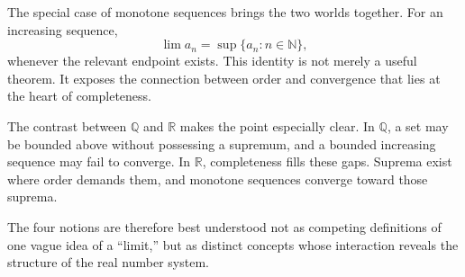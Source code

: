 \documentclass{essay}
\begin{document}
The special case of monotone sequences brings the two worlds together. For an increasing sequence,
\[
    \lim a_n=\sup\{a_n:n\in\mathbb{N}\},
\]
whenever the relevant endpoint exists. This identity is not merely a useful theorem. It exposes the connection between order and convergence that lies at the heart of completeness.

The contrast between $\mathbb{Q}$ and $\mathbb{R}$ makes the point especially clear. In $\mathbb{Q}$, a set may be bounded above without possessing a supremum, and a bounded increasing sequence may fail to converge. In $\mathbb{R}$, completeness fills these gaps. Suprema exist where order demands them, and monotone sequences converge toward those suprema.

The four notions are therefore best understood not as competing definitions of one vague idea of a ``limit,'' but as distinct concepts whose interaction reveals the structure of the real number system.
\end{document}
